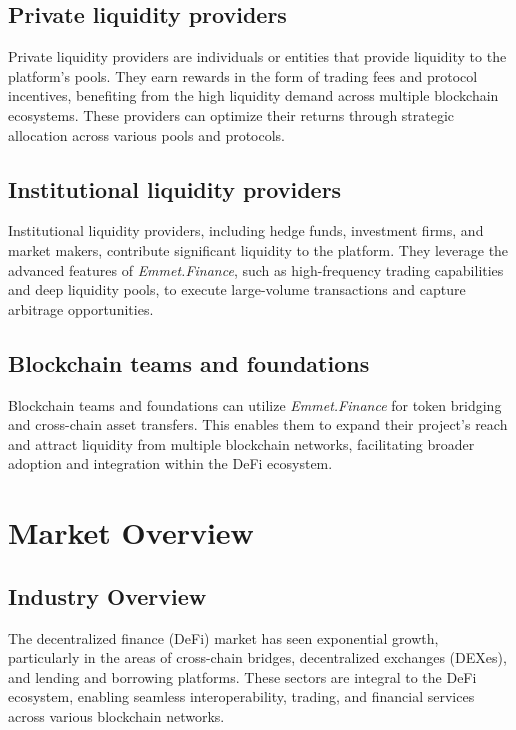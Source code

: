 \documentclass[12pt, a4paper]{article}
\begin{document}
\subsection{Private liquidity providers}

Private liquidity providers are individuals or entities that provide liquidity to the platform's pools. They earn rewards in the form of trading fees and protocol incentives, benefiting from the high liquidity demand across multiple blockchain ecosystems. These providers can optimize their returns through strategic allocation across various pools and protocols.

\subsection{Institutional liquidity providers}

Institutional liquidity providers, including hedge funds, investment firms, and market makers, contribute significant liquidity to the platform. They leverage the advanced features of \textit{Emmet.Finance}, such as high-frequency trading capabilities and deep liquidity pools, to execute large-volume transactions and capture arbitrage opportunities.

\subsection{Blockchain teams and foundations}

Blockchain teams and foundations can utilize \textit{Emmet.Finance} for token bridging and cross-chain asset transfers. This enables them to expand their project's reach and attract liquidity from multiple blockchain networks, facilitating broader adoption and integration within the DeFi ecosystem.

\section{Market Overview}

\subsection{Industry Overview}

The decentralized finance (DeFi) market has seen exponential growth, particularly in the areas of cross-chain bridges, decentralized exchanges (DEXes), and lending and borrowing platforms. These sectors are integral to the DeFi ecosystem, enabling seamless interoperability, trading, and financial services across various blockchain networks.
\end{document}
